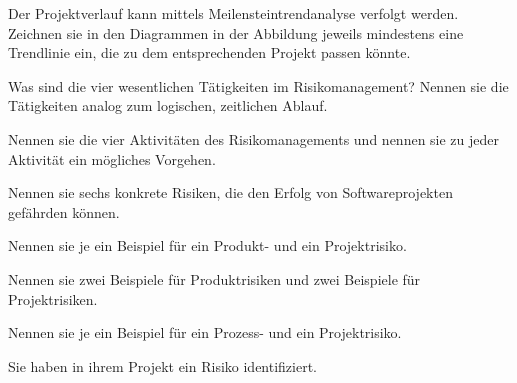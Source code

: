 \documentclass[12pt]{exam}
\begin{document}
\begin{questions}
\question[4] Der Projektverlauf kann mittels Meilensteintrendanalyse verfolgt werden. Zeichnen sie in den Diagrammen in der Abbildung jeweils mindestens eine Trendlinie ein, die zu dem entsprechenden Projekt passen könnte. \\
\addpoints

\question[5] Was sind die vier wesentlichen Tätigkeiten im Risikomanagement? Nennen sie die Tätigkeiten analog zum logischen, zeitlichen Ablauf.
\addpoints

\question[6] Nennen sie die vier Aktivitäten des Risikomanagements und nennen sie zu jeder Aktivität ein mögliches Vorgehen.
\addpoints

\question[3] Nennen sie sechs konkrete Risiken, die den Erfolg von Softwareprojekten gefährden können.
\addpoints

\question[2] Nennen sie je ein Beispiel für ein Produkt- und ein Projektrisiko.
\addpoints

\question[4] Nennen sie zwei Beispiele für Produktrisiken und zwei Beispiele für Projektrisiken.
\addpoints

\question[2] Nennen sie je ein Beispiel für ein Prozess- und ein Projektrisiko.
\addpoints

\question[4] Sie haben in ihrem Projekt ein Risiko identifiziert.
\noaddpoints
{}


\end{questions}
\end{document}
